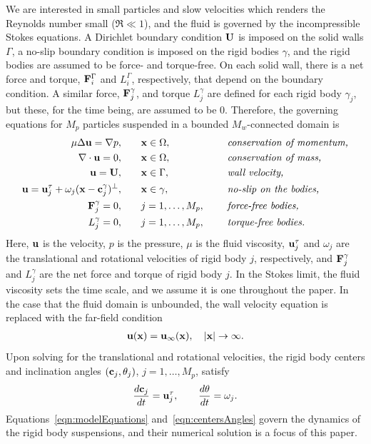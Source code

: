 \documentclass[AMA,STIX1COL]{WileyNJD-v2}
\begin{document}
We are interested in small particles and slow velocities which renders
the Reynolds number small ($\Re \ll 1$), and the fluid is governed by the
incompressible Stokes equations.  A Dirichlet boundary condition ${\mathbf{U}}$
is imposed on the solid walls $\Gamma$, a no-slip boundary condition is
imposed on the rigid bodies $\gamma$, and the rigid bodies are assumed
to be force- and torque-free.  On each solid wall, there is a net force
and torque, ${\mathbf{F}}^\Gamma_i$ and $L^\Gamma_i$, respectively, that depend
on the boundary condition.  A similar force, ${\mathbf{F}}^\gamma_j$, and torque
$L^\gamma_j$ are defined for each rigid body $\gamma_j$, but these, for
the time being, are assumed to be 0.  Therefore, the governing equations
for $M_p$ particles suspended in a bounded $M_w$-connected domain is
\begin{equation}
  \label{eqn:modelEquations}
  \begin{aligned}
  \mu \Delta {\mathbf{u}} = {\nabla} p, &\hspace{20pt} {\mathbf{x}} \in \Omega, \hspace*{.2in}
    &&\mbox{\it conservation of momentum,}\\
  {\nabla} \cdot {\mathbf{u}} = 0, &\hspace{20pt} {\mathbf{x}} \in \Omega, \hspace*{.2in}
    &&\mbox{\it conservation of mass,} \\
  {\mathbf{u}} = {\mathbf{U}}, &\hspace{20pt} {\mathbf{x}} \in \Gamma, \hspace*{.2in} 
    &&\mbox{\it wall velocity,} \\
  {\mathbf{u}} = {\mathbf{u}}^\tau_j + \omega_j({\mathbf{x}}-{\mathbf{c}}^\gamma_j)^\perp,&\hspace{20pt} 
    {\mathbf{x}} \in \gamma, \hspace*{.2in} &&\mbox{\it no-slip on the bodies,} \\
  {\mathbf{F}}_j^\gamma = 0, &\hspace{20pt}j=1,\ldots,M_p, \hspace*{.2in} 
    &&\mbox{\it force-free bodies,} \\
  L_j^\gamma = 0, &\hspace{20pt}j=1,\ldots,M_p, \hspace*{.2in} 
    &&\mbox{\it torque-free bodies.}
  \end{aligned}
\end{equation}
Here, ${\mathbf{u}}$ is the velocity, $p$ is the pressure, $\mu$ is the fluid
viscosity, ${\mathbf{u}}^\tau_j$ and $\omega_j$ are the translational and
rotational velocities of rigid body $j$, respectively, and
${\mathbf{F}}_j^\gamma$ and $L_j^\gamma$ are the net force and torque of rigid
body $j$.  In the Stokes limit, the fluid viscosity sets
the time scale, and we assume it is one throughout the paper.  In the
case that the fluid domain is unbounded, the wall velocity equation is
replaced with the far-field condition
\begin{align*}
  {\mathbf{u}}({\mathbf{x}}) = {\mathbf{u}}_\infty({\mathbf{x}}), \quad |{\mathbf{x}}| \rightarrow \infty.
\end{align*}
Upon solving for the translational and rotational velocities, the rigid
body centers and inclination angles $({\mathbf{c}}_j,\theta_j)$,
$j=1,\ldots,M_p$, satisfy
\begin{align}
  \frac{d{\mathbf{c}}_j}{dt} = {\mathbf{u}}^\tau_j, \qquad 
  \frac{d\theta}{dt} = \omega_j.
\label{eqn:centersAngles}
\end{align}
Equations~\eqref{eqn:modelEquations} and~\eqref{eqn:centersAngles} govern
the dynamics of the rigid body suspensions, and their numerical solution
is a focus of this paper.
\end{document}
